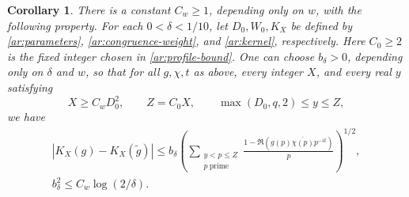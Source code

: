 \documentclass[twoside]{aomart}
\theoremstyle{paperplain}
\newtheorem{corollary}[theorem]{Corollary}
\theoremstyle{paperdefinition}
\numberwithin{equation}{section}
\begin{document}
\begin{corollary}
\label{con:comparison}
There is a constant $C_w\ge1$, depending only on $w$, with the
following property. For each $0<\delta<1/10$, let $D_0,W_0,K_X$
be defined by \eqref{ar:parameters}, \eqref{ar:congruence-weight},
and \eqref{ar:kernel}, respectively. Here $C_0\ge2$ is the fixed
integer chosen in \eqref{ar:profile-bound}.
One can choose $b_\delta>0$, depending only on $\delta$ and $w$,
so that for all $g,\chi,t$ as above, every integer $X$, and every
real $y$ satisfying
\begin{equation*}
 X\ge C_wD_0^2,\qquad Z=C_0X,\qquad \max(D_0,q,2)\le y\le Z,
\end{equation*}
we have
\begin{equation}
 \begin{gathered}
 |K_X(g)-K_X(\widetilde g)|
 \le b_\delta
 \left(\sum_{\substack{y<p\le Z\\p\ \mathrm{prime}}}
       \frac{1-\Re(g(p)\overline{\chi(p)}p^{-it})}{p}\right)^{1/2},\\
 b_\delta^2\le C_w\log(2/\delta).
 \end{gathered}
 \label{con:model-comparison-bound}
\end{equation}
\end{corollary}
\end{document}
